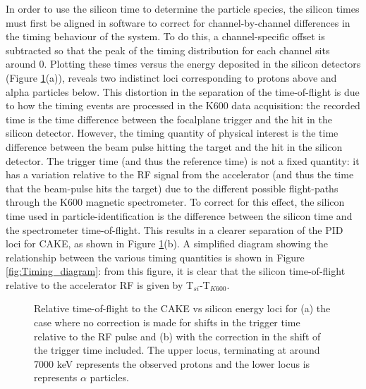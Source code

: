 \documentclass[11pt]{report}
\begin{document}
In order to use the silicon time to determine the particle species, the silicon times must first
be aligned in software to correct for channel-by-channel differences in the timing behaviour of the
system. To do this, a channel-specific offset is subtracted so that the peak of the timing distribution
for each channel sits around 0. Plotting these times versus the energy deposited in the silicon detectors
(Figure \ref{fig:cakepid}(a)), reveals two indistinct loci corresponding to protons above and alpha particles
below. This distortion in the separation of the time-of-flight is due to how the timing events are
processed in the K600 data acquisition: the recorded time is the time difference between the focalplane
trigger and the hit in the silicon detector. However, the timing quantity of physical interest
is the time difference between the beam pulse hitting the target and the hit in the silicon detector.
The trigger time (and thus the reference time) is not a fixed quantity: it has a variation relative to
the RF signal from the accelerator (and thus the time that the beam-pulse hits the target) due to the
different possible flight-paths through the K600 magnetic spectrometer.
To correct for this effect, the silicon time used in particle-identification is the difference between
the silicon time and the spectrometer time-of-flight. This results in a clearer separation of
the PID loci for CAKE, as shown in Figure \ref{fig:cakepid}(b). A simplified diagram showing the relationship
between the various timing quantities is shown in Figure \ref{fig:Timing_diagram}: from this figure, it is clear that the
silicon time-of-flight relative to the accelerator RF is given by T$_{si}$-T$_{K600}$.

\begin{figure}[]
\centerline{\vspace{0cm}\hspace{0cm}
}
\centering
\caption{Relative time-of-flight to the CAKE vs silicon energy loci for (a) the case where no correction
is made for shifts in the trigger time relative to the RF pulse and (b) with the correction in the shift of the
trigger time included. The upper locus, terminating at around 7000 keV represents the observed protons and
the lower locus is represents $\alpha$ particles.}
\label{fig:cakepid}
\end{figure} 
\end{document}
